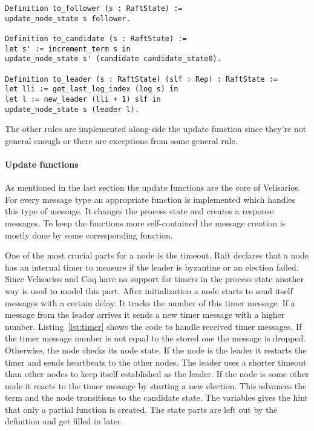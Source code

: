 \begin{lstlisting}[style=coq,label=lst:trans1,
caption=The definitions on how a node changes it node state.]
Definition to_follower (s : RaftState) :=
update_node_state s follower.

Definition to_candidate (s : RaftState) :=
let s' := increment_term s in
update_node_state s' (candidate candidate_state0).

Definition to_leader (s : RaftState) (slf : Rep) : RaftState :=
let lli := get_last_log_index (log s) in
let l := new_leader (lli + 1) slf in 
update_node_state s (leader l).
\end{lstlisting}

The other rules are implemented along-side the update function since
they're not general enough or there are exceptions from some general rule.

\paragraph{Update functions}
As mentioned in the last section the update functions are the core
of Velisarios. For every message type an appropriate function is implemented
which handles this type of message. It changes the process state and
creates a response messages. To keep the functions more self-contained the
message creation is mostly done by some corresponding 
function.

One of the most crucial parts for a node is the timeout.
Raft declares that a node has an internal timer to measure
if the leader is byzantine or an election failed. 
Since Velisarios and Coq have no support
for timers in the process state another way is used to model this part.
After initialization a node starts to send itself messages with a
certain delay. It tracks the number of this timer message.
If a message from the leader arrives it sends a new timer
message with a higher number. Listing~\ref{lst:timer} shows
the code to handle received timer messages. If the timer message
number is not equal to the stored one the message is dropped.
Otherwise, the node checks its node state.
If the node is the leader it restarts the timer and sends heartbeats
to the other nodes. The leader uses a shorter timeout than other nodes
to keep itself established as the leader.
If the node is some other node it reacts to the timer message by
starting a new election. This advances the term and the node 
transitions to the candidate state. The  variables gives
the hint that only a partial function is created. The state parts
are left out by the definition and get filled in later.

